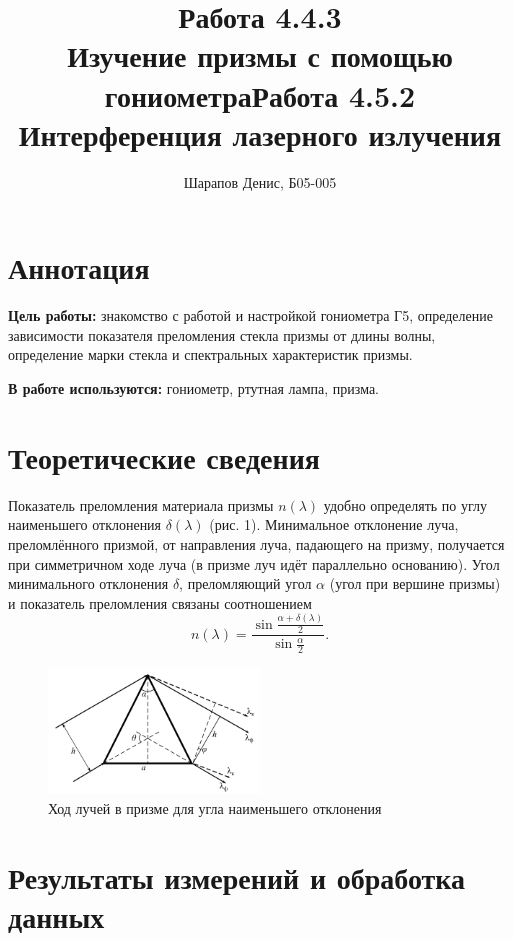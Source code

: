 \documentclass[a4paper]{article}
\title{Работа 4.4.3 \\ Изучение призмы с помощью гониометра}
\title{Работа 4.5.2 \\ Интерференция лазерного излучения}
\author{Шарапов Денис, Б05-005}
\date{}
\begin{document}
    \maketitle
    \tableofcontents
    \newpage
    
\section{Аннотация}

\noindent\textbf{Цель работы:} знакомство с работой и настройкой гониометра Г5, определение зависимости показателя преломления стекла призмы от длины волны, определение марки стекла и спектральных характеристик призмы. \smallskip
 
\noindent \textbf{В работе используются:} гониометр, ртутная лампа, призма.

\section{Теоретические сведения}

Показатель преломления материала призмы $n(\lambda)$ удобно определять
по углу наименьшего отклонения $\delta(\lambda)$ (рис. 1). Минимальное отклонение луча, преломлённого призмой, от направления луча, падающего
на призму, получается при симметричном ходе луча (в призме луч идёт
параллельно основанию). Угол минимального отклонения $\delta$, преломляющий угол $\alpha$ (угол при вершине призмы) и показатель преломления
связаны соотношением $$n(\lambda) = \frac{\sin{\frac{\alpha + \delta(\lambda)}{2}}}{\sin{\frac{\alpha}{2}}}.$$

\begin{figure}[ht!]
    \centering
    \includegraphics[width = 0.5\textwidth]{image/pic1.png}
    \caption{Ход лучей в призме для угла наименьшего отклонения}
\end{figure}

\section{Результаты измерений и обработка данных}
\end{document}

